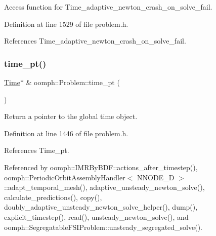 Access function for Time\+\_\+adaptive\+\_\+newton\+\_\+crash\+\_\+on\+\_\+solve\+\_\+fail. 



Definition at line 1529 of file problem.\+h.



References Time\+\_\+adaptive\+\_\+newton\+\_\+crash\+\_\+on\+\_\+solve\+\_\+fail.

\mbox{\label{classoomph_1_1Problem_a425403e4cb6678015b20f2dddc7a2f89}} 
\subsubsection{\texorpdfstring{time\+\_\+pt()}{time\_pt()}\hspace{0.1cm}{\footnotesize\ttfamily [1/2]}}
{\footnotesize\ttfamily \hyperlink{classoomph_1_1Time}{Time}$\ast$ \& oomph\+::\+Problem\+::time\+\_\+pt (\begin{DoxyParamCaption}{ }\end{DoxyParamCaption})\hspace{0.3cm}{\ttfamily [inline]}}



Return a pointer to the global time object. 



Definition at line 1446 of file problem.\+h.



References Time\+\_\+pt.



Referenced by oomph\+::\+I\+M\+R\+By\+B\+D\+F\+::actions\+\_\+after\+\_\+timestep(), oomph\+::\+Periodic\+Orbit\+Assembly\+Handler$<$ N\+N\+O\+D\+E\+\_\+D $>$\+::adapt\+\_\+temporal\+\_\+mesh(), adaptive\+\_\+unsteady\+\_\+newton\+\_\+solve(), calculate\+\_\+predictions(), copy(), doubly\+\_\+adaptive\+\_\+unsteady\+\_\+newton\+\_\+solve\+\_\+helper(), dump(), explicit\+\_\+timestep(), read(), unsteady\+\_\+newton\+\_\+solve(), and oomph\+::\+Segregatable\+F\+S\+I\+Problem\+::unsteady\+\_\+segregated\+\_\+solve().

\mbox{\label{classoomph_1_1Problem_aa86b09eac493cfa9fcbe57734985ba19}} 
